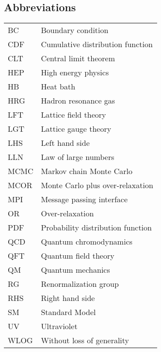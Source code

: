 \documentclass[12pt]{book}
\theoremstyle{definition}
\newenvironment{frontstuff}
  {\centering\chapter*{}}
  {\clearpage}
\begin{document}
\begin{frontstuff}
\section*{Abbreviations}
\begin{tabular}{ll}
BC      &       Boundary condition \\
CDF     &       Cumulative distribution function \\
CLT     &       Central limit theorem\\
HEP     &       High energy physics\\
HB      &       Heat bath\\
HRG     &       Hadron resonance gas\\
LFT     &       Lattice field theory\\
LGT     &       Lattice gauge theory\\
LHS     &       Left hand side\\
LLN     &       Law of large numbers\\
MCMC    &       Markov chain Monte Carlo\\
MCOR    &       Monte Carlo plus over-relaxation \\
MPI     &       Message passing interface \\
OR      &       Over-relaxation \\
PDF     &       Probability distribution function \\
QCD     &       Quantum chromodynamics \\
QFT     &       Quantum field theory \\
QM      &       Quantum mechanics \\
RG      &       Renormalization group \\
RHS     &       Right hand side \\
SM      &       Standard Model \\
UV      &       Ultraviolet \\
WLOG    &       Without loss of generality
\end{tabular}
\clearpage



\end{frontstuff}
\end{document}
